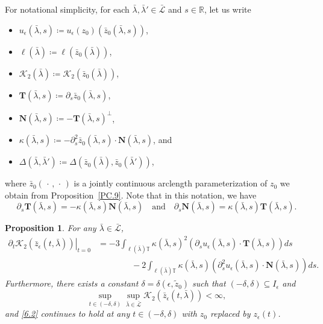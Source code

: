 \documentclass[reqno,centertags,12pt]{amsart}
\newtheorem{proposition}[theorem]{Proposition}
\theoremstyle{definition}
\numberwithin{equation}{section}
\newcommand{\bbR}{{\mathbb{R}}}
\newcommand{\bbT}{{\mathbb{T}}}
\begin{document}
For notational simplicity, for each $\bar{\lambda},\bar{\lambda}'\in\bar{\mathcal{L}}$ and
$s\in\bbR$, let us write
\begin{itemize}
    \item $u_{\epsilon}(\bar{\lambda},s)
    \coloneqq u_{\epsilon}(z_{0})(\bar{z}_{0}(\bar{\lambda},s))$,
    \item $\ell(\bar{\lambda})
    \coloneqq \ell(\bar{z}_{0}(\bar{\lambda}))$,
    \item $\mathcal{K}_{2}(\bar{\lambda})
    \coloneqq \mathcal{K}_{2}(\bar{z}_{0}(\bar{\lambda}))$,
    \item $\mathbf{T}(\bar{\lambda},s)
    \coloneqq \partial_{s}\bar{z}_{0}(\bar{\lambda},s)$,
    \item $\mathbf{N}(\bar{\lambda},s)
    \coloneqq -\mathbf{T}(\bar{\lambda},s)^{\perp}$,
    \item $\kappa(\bar{\lambda},s)
    \coloneqq -\partial_{s}^{2}\bar{z}_{0}(\bar{\lambda},s)
    \cdot \mathbf{N}(\bar{\lambda},s)$, and
    \item $\Delta(\bar{\lambda},\bar{\lambda}')
    \coloneqq \Delta(\bar{z}_{0}(\bar{\lambda}), \bar{z}_{0}(\bar{\lambda}'))$,
\end{itemize}
where $\bar{z}_{0}(\,\cdot\,,\,\cdot\,)$ is a jointly continuous
arclength parameterization of $z_{0}$ we obtain from
Proposition~\ref{PC.9}.
Note that in this notation, we have
\[
    \partial_{s}\mathbf{T}(\bar{\lambda},s)
    = -\kappa(\bar{\lambda},s)\mathbf{N}(\bar{\lambda},s)
    \quad\textrm{and}\quad
    \partial_{s}\mathbf{N}(\bar{\lambda},s)
    = \kappa(\bar{\lambda},s)\mathbf{T}(\bar{\lambda},s).
\]

\begin{proposition}\label{P6.7}
    For any $\bar{\lambda}\in\bar{\mathcal{L}}$,
    \begin{equation}\label{6.2}
    \begin{aligned}
        \left.\partial_{t}\mathcal{K}_{2}(\bar{z}_{\epsilon}(t,\bar{\lambda}))
        \right|_{t=0} &=
        -3\int_{\ell(\bar{\lambda})\bbT}
        \kappa(\bar{\lambda},s)^{2}
        \left(\partial_{s}u_{\epsilon}(\bar{\lambda},s)\cdot
        \mathbf{T}(\bar{\lambda},s)\right)ds
        \\&\quad\quad\quad\quad
        - 2\int_{\ell(\bar{\lambda})\bbT}
        \kappa(\bar{\lambda},s)
        \left(\partial_{s}^{2}u_{\epsilon}(\bar{\lambda},s)\cdot
        \mathbf{N}(\bar{\lambda},s)\right)ds.
    \end{aligned}
    \end{equation}
    Furthermore, there exists a constant $\delta=\delta(\epsilon,\tilde{z}_{0})$
    such that $(-\delta,\delta)\subseteq I_{\epsilon}$ and
    \[
        \sup_{t\in (-\delta,\delta)}\sup_{\bar{\lambda}\in\bar{\mathcal{L}}}
        \mathcal{K}_{2}(\bar{z}_{\epsilon}(t,\bar{\lambda})) < \infty,
    \]
    and \eqref{6.2} continues to hold at any
    $t\in(-\delta,\delta)$ with $z_{0}$ replaced by $z_{\epsilon}(t)$.
\end{proposition}
\end{document}
